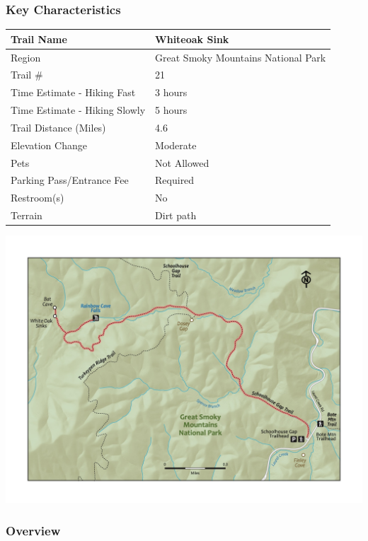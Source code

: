 \documentclass[
  letterpaper,
  DIV=11,
  numbers=noendperiod]{scrartcl}
\begin{document}
\hypertarget{key-characteristics-22}{%
\subsubsection{Key Characteristics}\label{key-characteristics-22}}

\begin{longtable}[]{@{}ll@{}}
\toprule\noalign{}
Trail Name & Whiteoak Sink \\
\midrule\noalign{}
\endhead
\bottomrule\noalign{}
\endlastfoot
Region & Great Smoky Mountains National Park \\
Trail \# & 21 \\
Time Estimate - Hiking Fast & 3 hours \\
Time Estimate - Hiking Slowly & 5 hours \\
Trail Distance (Miles) & 4.6 \\
Elevation Change & Moderate \\
Pets & Not Allowed \\
Parking Pass/Entrance Fee & Required \\
Restroom(s) & No \\
Terrain & Dirt path \\
\end{longtable}

\includegraphics{maps/trail-23-map.jpeg}

\hypertarget{overview-22}{%
\subsubsection{Overview}\label{overview-22}}
\end{document}
